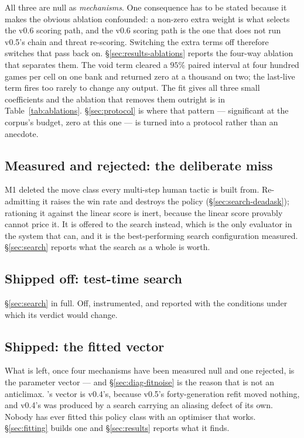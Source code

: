 All three are null as \emph{mechanisms}. One consequence has to be stated because it makes the
obvious ablation confounded: a non-zero extra weight is what selects the v0.6 scoring path, and the
v0.6 scoring path is the one that does not run v0.5's chain and threat re-scoring. Switching the
extra terms off therefore switches that pass back on. \S\ref{sec:results-ablations} reports the
four-way ablation that separates them. The void term cleared a $95\%$ paired interval at four
hundred games per cell on one bank and returned zero at a thousand on two; the last-live term fires
too rarely to change any output. The fit gives all three small coefficients and the ablation that
removes them outright is in Table~\ref{tab:ablations}. \S\ref{sec:protocol} is where that pattern
--- significant at the corpus's budget, zero at this one --- is turned into a protocol rather than
an anecdote.

\subsection{Measured and rejected: the deliberate miss}
\label{sec:mech-declare}

M1 deleted the move class every multi-step human tactic is built from. Re-admitting it raises the
win rate and destroys the policy (\S\ref{sec:search-deadask}); rationing it against the linear score
is inert, because the linear score provably cannot price it. It is offered to the search instead,
which is the only evaluator in the system that can, and it is the best-performing search
configuration measured. \S\ref{sec:search} reports what the search as a whole is worth.

\subsection{Shipped off: test-time search}
\label{sec:mech-leaves}

\S\ref{sec:search} in full. Off, instrumented, and reported with the conditions under which its
verdict would change.

\subsection{Shipped: the fitted vector}
\label{sec:mech-partner}

What is left, once four mechanisms have been measured null and one rejected, is the parameter vector
--- and \S\ref{sec:diag-fitnoise} is the reason that is not an anticlimax. \vfive{}'s vector is
v0.4's, because v0.5's forty-generation refit moved nothing, and v0.4's was produced by a search
carrying an aliasing defect of its own. Nobody has ever fitted this policy class with an optimiser
that works. \S\ref{sec:fitting} builds one and \S\ref{sec:results} reports what it finds.

